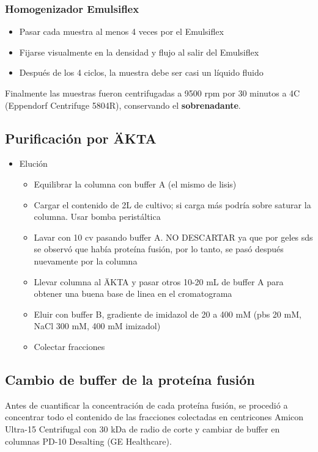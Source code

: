 \begin{appendix}
\subsubsection{Homogenizador Emulsiflex}
     \begin{itemize}
        \item{Pasar cada muestra al menos 4 veces por el Emulsiflex}
        \item{Fijarse visualmente en la densidad y flujo al salir del Emulsiflex}
        \item{Después de los 4 ciclos, la muestra debe ser casi un líquido fluido}
    \end{itemize}

Finalmente las muestras fueron centrifugadas a 9500 \ac{rpm} por 30 minutos a 4\textdegree C (Eppendorf Centrifuge 5804R), conservando el \textbf{sobrenadante}. 


\subsection{Purificación por \"{A}KTA}

\begin{itemize}
    \item{Elución}
     \begin{itemize}
        \item{Equilibrar la columna con buffer A (el mismo de lisis)}
        \item{Cargar el contenido de 2L de cultivo; si carga más podría sobre saturar la columna. Usar bomba peristáltica}
        \item{Lavar con 10 \ac{cv} pasando buffer A. NO DESCARTAR ya que por geles \ac{sds} se observó que había proteína fusión, por lo tanto, se pasó después nuevamente por la columna}
        \item{Llevar columna al \"{A}KTA y pasar otros 10-20 mL de buffer A para obtener una buena base de linea en el cromatograma}
        \item{Eluir con buffer B, gradiente de imidazol de 20 a 400 mM (\ac{pbs} 20 mM, NaCl 300 mM, 400 mM imizadol)}
        \item{Colectar fracciones}
    \end{itemize}
\end{itemize}

\subsection{Cambio de buffer de la proteína fusión}
Antes de cuantificar la concentración de cada proteína fusión, se procedió a concentrar todo el contenido de las fracciones colectadas en centricones Amicon Ultra-15 Centrifugal con 30 kDa de radio de corte y cambiar de buffer en columnas PD-10 Desalting (GE Healthcare).


\end{appendix}
